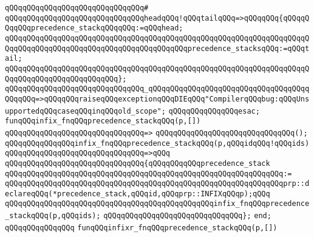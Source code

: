 \verb|qQQqqQQqqQQqqQQqqQQqqQQqqQQqqQQq#|\newline
\verb|qQQqqQQqqQQqqQQqqQQqqQQqqQQqqQQqheadqQQq!qQQqtailqQQq=>qQQqqQQq{qQQqqQQqqQQqprecedence_stackqQQqqQQq:=qQQqhead;|\newline
\verb|qQQqqQQqqQQqqQQqqQQqqQQqqQQqqQQqqQQqqQQqqQQqqQQqqQQqqQQqqQQqqQQqqQQqqQQqqQQqqQQqqQQqqQQqqQQqqQQqqQQqqQQqqQQqqQQqprecedence_stacksqQQq:=qQQqtail;|\newline
\verb|qQQqqQQqqQQqqQQqqQQqqQQqqQQqqQQqqQQqqQQqqQQqqQQqqQQqqQQqqQQqqQQqqQQqqQQqqQQqqQQqqQQqqQQqqQQqqQQq};|\newline
\newline
\verb|qQQqqQQqqQQqqQQqqQQqqQQqqQQqqQQq_qQQqqQQqqQQqqQQqqQQqqQQqqQQqqQQqqQQqqQQqqQQq=>qQQqqQQqraiseqQQqexceptionqQQqDIEqQQq"CompilerqQQqbug:qQQqUnsupportedqQQqcaseqQQqinqQQqold_scope";|\newline
\verb|qQQqqQQqqQQqqQQqesac;|\newline
\newline
\newline
\verb|funqQQqinfix_fnqQQqprecedence_stackqQQq(p,[])|\newline
\verb|qQQqqQQqqQQqqQQqqQQqqQQqqQQqqQQq=>|\newline
\verb|qQQqqQQqqQQqqQQqqQQqqQQqqQQqqQQq();|\newline
\newline
\verb|qQQqqQQqqQQqqQQqinfix_fnqQQqprecedence_stackqQQq(p,qQQqidqQQq!qQQqids)|\newline
\verb|qQQqqQQqqQQqqQQqqQQqqQQqqQQqqQQq=>qQQq|\newline
\verb|qQQqqQQqqQQqqQQqqQQqqQQqqQQqqQQq{qQQqqQQqqQQqprecedence_stack|\newline
\verb|qQQqqQQqqQQqqQQqqQQqqQQqqQQqqQQqqQQqqQQqqQQqqQQqqQQqqQQqqQQqqQQq:=|\newline
\verb|qQQqqQQqqQQqqQQqqQQqqQQqqQQqqQQqqQQqqQQqqQQqqQQqqQQqqQQqqQQqqQQqprp::declareqQQq(*precedence_stack,qQQqid,qQQqprp::INFIXqQQqp);qQQq|\newline
\newline
\verb|qQQqqQQqqQQqqQQqqQQqqQQqqQQqqQQqqQQqqQQqqQQqqQQqinfix_fnqQQqprecedence_stackqQQq(p,qQQqids);|\newline
\verb|qQQqqQQqqQQqqQQqqQQqqQQqqQQqqQQq};|\newline
\verb|end;|\newline
\verb|qQQqqQQqqQQqqQQq|\newline
\newline
\verb|funqQQqinfixr_fnqQQqprecedence_stackqQQq(p,[])|\newline

